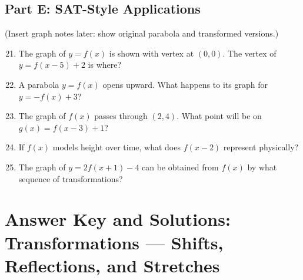 \documentclass[12pt]{article}
\begin{document}
\subsection*{Part E: SAT-Style Applications}
(Insert graph notes later: show original parabola and transformed versions.)

\begin{enumerate}
  \setcounter{enumi}{20}
  \item The graph of \(y = f(x)\) is shown with vertex at \((0,0)\).  
  The vertex of \(y = f(x - 5) + 2\) is where?
  \item A parabola \(y = f(x)\) opens upward.  
  What happens to its graph for \(y = -f(x) + 3\)?
  \item The graph of \(f(x)\) passes through \((2, 4)\).  
  What point will be on \(g(x) = f(x - 3) + 1\)?
  \item If \(f(x)\) models height over time, what does \(f(x - 2)\) represent physically?
  \item The graph of \(y = 2f(x + 1) - 4\) can be obtained from \(f(x)\) by what sequence of transformations?
\end{enumerate}

\newpage


\section*{Answer Key and Solutions: Transformations — Shifts, Reflections, and Stretches}
\end{document}
